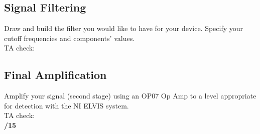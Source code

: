 \documentclass{article}
\begin{document}
\subsection*{Signal Filtering}
Draw and build the filter you would like to have for your device. Specify your cutoff frequencies and components’ values.\vspace{6cm}\\TA check: \underline{\hspace{2cm}}\\

\subsection*{Final Amplification}
Amplify your signal (second stage) using an OP07 Op Amp to a level appropriate for detection with the NI ELVIS system.\vspace{6cm}\\TA check: \underline{\hspace{2cm}}\\

\hfill \textbf{\underline{\hspace{1cm}}/15}
\end{document}
